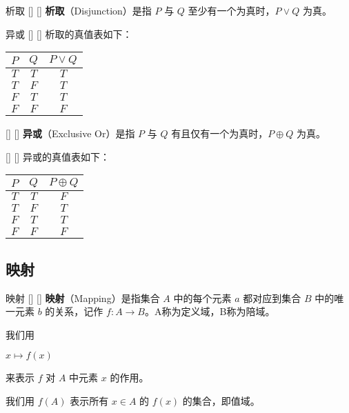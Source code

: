 \documentclass[UTF8]{ctexart}
\begin{document}
		\begin{dfn}
            []
            {析取}
            []
            []
			\textbf{析取}（Disjunction）是指 $P$ 与 $Q$ 至少有一个为真时，$P \lor Q$ 为真。
		\end{dfn}

		\begin{ppt}
            []
            {异或}
            []
            []
			析取的真值表如下：
			\begin{center}
				\begin{tabular}{c|c|c}
					$P$ & $Q$ & $P \lor Q$ \\
					\hline
					$T$ & $T$ & $T$ \\
					$T$ & $F$ & $T$ \\
					$F$ & $T$ & $T$ \\
					$F$ & $F$ & $F$ \\
				\end{tabular}
			\end{center}
		\end{ppt}

		\begin{dfn}
            []
            {}
            []
            []
			\textbf{异或}（Exclusive Or）是指 $P$ 与 $Q$ 有且仅有一个为真时，$P \oplus Q$ 为真。
		\end{dfn}

		\begin{ppt}
            []
            {}
            []
            []
			异或的真值表如下：
			\begin{center}
				\begin{tabular}{c|c|c}
					$P$ & $Q$ & $P \oplus Q$ \\
					\hline
					$T$ & $T$ & $F$ \\
					$T$ & $F$ & $T$ \\
					$F$ & $T$ & $T$ \\
					$F$ & $F$ & $F$ \\
				\end{tabular}
			\end{center}
		\end{ppt}

    \subsection{映射}

        \begin{dfn}
            []
            {映射}
            []
            []
            \textbf{映射}（Mapping）是指集合 $A$ 中的每个元素 $a$ 都对应到集合 $B$ 中的唯一元素 $b$ 的关系，记作 $f: A \to B$。A称为定义域，B称为陪域。
            
            我们用 
            \begin{center}
                $x \mapsto f(x)$ 
            \end{center}
            
            来表示 $f$ 对 $A$ 中元素 $x$ 的作用。
            
            我们用 $f(A)$ 表示所有 $x \in A$ 的 $f(x)$ 的集合，即值域。
        \end{dfn}
\end{document}

